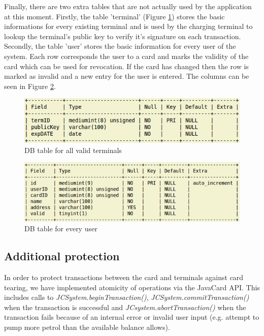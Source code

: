 \documentclass[a4paper,10pt]{llncs}
\begin{document}
Finally, there are two extra tables that are not actually used by the application at this moment. Firstly, the table 'terminal' (Figure \ref{figure:dbtable_terminal}) stores the basic informations for every existing terminal and is used by the charging terminal to lookup the terminal's public key to verify it's signature on each transaction. Secondly, the table 'user' stores the basic information for every user of the system. Each row corresponds the user to a card and marks the validity of the card which can be used for revocation. If the card has changed then the row is marked as invalid and a new entry for the user is entered. The columns can be seen in Figure \ref{figure:dbtable_user}.
    \begin{figure}
    	\centering
    	\includegraphics[scale=0.38]{img/dbtable_terminal.png}
    	\caption{\label{figure:dbtable_terminal}DB table for all valid terminals}
    \end{figure}    

    \begin{figure}
    	\centering
    	\includegraphics[scale=0.38]{img/dbtable_user.png}
    	\caption{\label{figure:dbtable_user}DB table for every user}
    \end{figure}
    
    
\subsection{Additional protection}

In order to protect transactions between the card and terminals against card tearing, we have implemented atomicity of operations via the JavaCard API. This includes calls to \emph{JCSystem.beginTransaction()}, \emph{JCSystem.commitTransaction()} when the transaction is successful and \emph{JCsystem.abortTransaction()} when the transaction fails because of an internal error or invalid user input (e.g. attempt to pump more petrol than the available balance allows).
\end{document}
